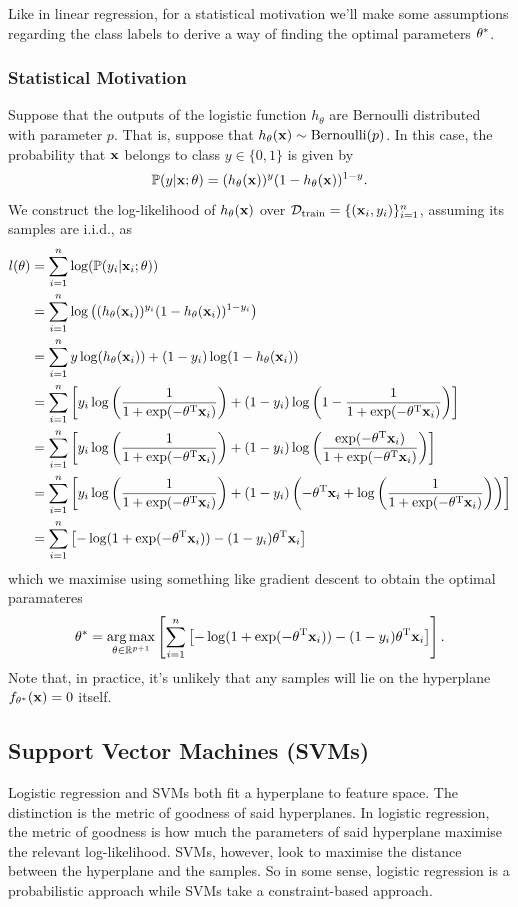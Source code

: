 \documentclass[11pt]{article}
\begin{document}
\noindent Like in linear regression, for a statistical motivation we'll make some assumptions regarding the class labels to derive a way of finding the optimal parameters $\theta^{*}$.

\subsubsection{Statistical Motivation}
Suppose that the outputs of the logistic function $h_{\theta}$ are Bernoulli distributed with parameter $p$. That is, suppose that $h_{\theta}(\mathbf{x})\sim\text{Bernoulli}(p)$. In this case, the probability that $\mathbf{x}$ belongs to class $y\in\{0, 1\}$ is given by
$$
\mathbb{P}(y|\mathbf{x};\theta)=(h_{\theta}(\mathbf{x}))^{y}(1-h_{\theta}(\mathbf{x}))^{1-y}.
$$
We construct the log-likelihood of $h_{\theta}(\mathbf{x})$ over $\mathcal{D}_{\text{train}}=\{(\mathbf{x}_i,y_i)\}_{i=1}^n$, assuming its samples are i.i.d., as
\begin{align*}
    l(\theta)
    &=
    \sum_{i=1}^n\log(\mathbb{P}(y_i|\mathbf{x}_i;\theta))\\
    &=
    \sum_{i=1}^n\log\left((h_{\theta}(\mathbf{x}_i))^{y_i}(1-h_{\theta}(\mathbf{x}_i))^{1-y_i}\right)\\
    &=
    \sum_{i=1}^ny\log(h_{\theta}(\mathbf{x}_i))+(1-y_i)\log(1-h_{\theta}(\mathbf{x}_i))\\
    &=
    \sum_{i=1}^n\left[y_i\log\left(\frac{1}{1+\exp(-\theta^{\text{T}}\mathbf{x}_i)}\right)+(1-y_i)\log\left(1-\frac{1}{1+\exp(-\theta^{\text{T}}\mathbf{x}_i)}\right)\right]\\
    &=
    \sum_{i=1}^n\left[y_i\log\left(\frac{1}{1+\exp(-\theta^{\text{T}}\mathbf{x}_i)}\right)+(1-y_i)\log\left(\frac{\exp(-\theta^{\text{T}}\mathbf{x}_i)}{1+\exp(-\theta^{\text{T}}\mathbf{x}_i)}\right)\right]\\
    &=
    \sum_{i=1}^n\left[y_i\log\left(\frac{1}{1+\exp(-\theta^{\text{T}}\mathbf{x}_i)}\right)+(1-y_i)\left(-\theta^{\text{T}}\mathbf{x}_i+\log\left(\frac{1}{1+\exp(-\theta^{\text{T}}\mathbf{x}_i)}\right)\right)\right]\\
    &=
    \sum_{i=1}^n\left[-\log(1+\exp(-\theta^{\text{T}}\mathbf{x}_i))-(1-y_i)\theta^{\text{T}}\mathbf{x}_i\right]
\end{align*}
which we maximise using something like gradient descent to obtain the optimal paramateres
$$
\theta^{*}
=
\operatorname*{arg\,max}_{\theta\in\mathbb{R}^{p+1}}\left[\sum_{i=1}^n\left[-\log(1+\exp(-\theta^{\text{T}}\mathbf{x}_i))-(1-y_i)\theta^{\text{T}}\mathbf{x}_i\right]\right].
$$
Note that, in practice, it's unlikely that any samples will lie on the hyperplane $f_{\theta^*}(\mathbf{x})=0$ itself.

\subsection{Support Vector Machines (SVMs)}
Logistic regression and SVMs both fit a hyperplane to feature space. The distinction is the metric of goodness of said hyperplanes. In logistic regression, the metric of goodness is how much the parameters of said hyperplane maximise the relevant log-likelihood. SVMs, however, look to maximise the distance between the hyperplane and the samples. So in some sense, logistic regression is a probabilistic approach while SVMs take a constraint-based approach.
\end{document}
